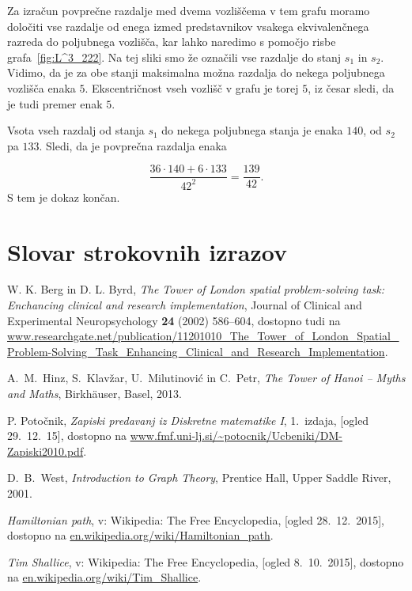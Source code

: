 \documentclass[12pt,a4paper]{amsart}
\theoremstyle{definition} %
\theoremstyle{plain} %
\newcommand{\geslo}[2]{\noindent\textbf{#1}\hspace*{3mm}\hangindent=\parindent\hangafter=1 #2}
\begin{document}
    Za izračun povprečne razdalje med dvema vozliščema v tem grafu moramo določiti vse razdalje od enega izmed predstavnikov vsakega ekvivalenčnega razreda do poljubnega vozlišča, kar lahko naredimo s pomočjo risbe grafa~\ref{fig:L^3_222}. Na tej sliki smo že označili vse razdalje do stanj $s_1$ in $s_2$. Vidimo, da je za obe stanji maksimalna možna razdalja do nekega poljubnega vozlišča enaka $5$. Ekscentričnost vseh vozlišč v grafu je torej $5$, iz česar sledi, da je tudi premer enak $5$. 
    
    Vsota vseh razdalj od stanja $s_1$ do nekega poljubnega stanja je enaka $140$, od $s_2$ pa $133$. Sledi, da je povprečna razdalja enaka
    
    \[ \frac{36 \cdot 140 + 6 \cdot 133}{{42}^2} = \frac{139}{42} .\]
    S tem je dokaz končan.
\endproof

\section*{Slovar strokovnih izrazov}

%
%

\begin{thebibliography}{99}

W. K. Berg in D. L. Byrd, \emph{The Tower of London spatial problem-solving task: Enchancing clinical and research implementation}, Journal of Clinical and Experimental Neuropsychology \textbf{24} (2002) 586--604,
dostopno tudi na \url{www.researchgate.net/publication/11201010_The_Tower_of_London_Spatial_Problem-Solving_Task_Enhancing_Clinical_and_Research_Implementation}.

 A.\ M.\ Hinz, S.\ Klavžar, U.\ Milutinović in C.\ Petr, \emph{The Tower of Hanoi – Myths and Maths}, Birkhäuser, Basel, 2013.

 P. Potočnik, \emph{Zapiski predavanj iz Diskretne matematike I}, 1.~izdaja, [ogled 29.~12.~15], dostopno na \url{www.fmf.uni-lj.si/~potocnik/Ucbeniki/DM-Zapiski2010.pdf}.

 D.\ B.\ West, \emph{Introduction to Graph Theory}, Prentice Hall, Upper Saddle River, 2001.

 \emph{Hamiltonian path}, v: Wikipedia: The Free Encyclopedia, [ogled 28.~12.~2015], dostopno na \url{en.wikipedia.org/wiki/Hamiltonian_path}.

 \emph{Tim Shallice}, v: Wikipedia: The Free Encyclopedia, [ogled 8.~10.~2015], dostopno na \url{en.wikipedia.org/wiki/Tim_Shallice}.
\end{thebibliography}
\end{document}
